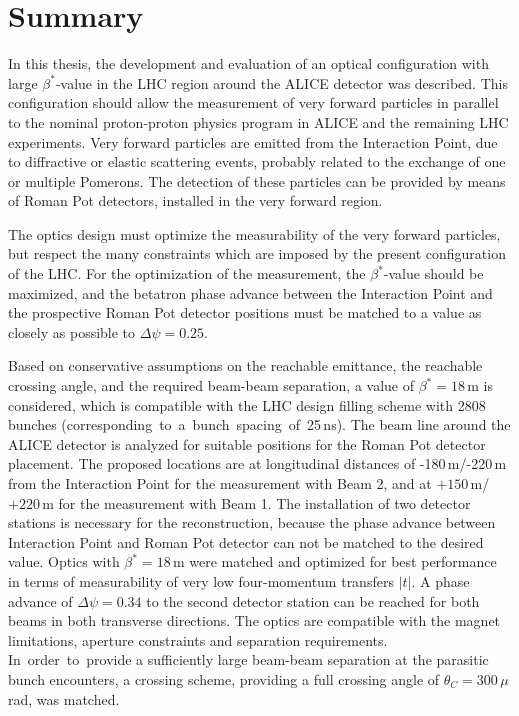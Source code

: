\chapter*{Summary}\label{chap:8}

In this thesis, the development and evaluation of an optical configuration with large $\beta^*$-value in the LHC region around the ALICE detector was described. This configuration should allow the measurement of very forward particles in parallel to the nominal proton-proton physics program in ALICE and the remaining LHC experiments. Very forward particles are emitted from the Interaction Point, due to diffractive or elastic scattering events, probably related to the exchange of one or multiple Pomerons. The detection of these particles can be provided by means of Roman Pot detectors, installed in the very forward region.

The optics design must optimize the measurability of the very forward particles, but respect the many constraints which are imposed by the present configuration of the LHC. For the optimization of the measurement, the $\beta^*$-value should be maximized, and the betatron phase advance between the Interaction Point and the prospective Roman Pot detector positions must be matched to a value as closely as possible to $\Delta \psi =0.25$.

Based on conservative assumptions on the reachable emittance, the reachable crossing angle, and the required beam-beam separation, a value of $\beta^*=18\,$m is considered, which is compatible with the LHC design filling scheme with 2808 bunches \mbox{(corresponding to a bunch spacing of 25$\,$ns)}. The beam line around the ALICE detector is analyzed for suitable positions for the Roman Pot detector placement. The proposed locations are at longitudinal distances of -180$\,$m/-220$\,$m from the Interaction Point for the measurement with Beam 2, and at $+150\,$m/$+220\,$m for the measurement with Beam 1. The installation of two detector stations is necessary for the reconstruction, because the phase advance between Interaction Point and Roman Pot detector can not be matched to the desired value.
Optics with $\beta^*=18\,$m were matched and optimized for best performance in terms of measurability of very low four-momentum transfers $|t|$. A phase advance of $\Delta \psi = 0.34$ to the second detector station can be reached for both beams in both transverse directions. The optics are compatible with the \mbox{magnet} limitations, aperture constraints and separation requirements. \mbox{In order to provide} a sufficiently large beam-beam separation at the parasitic bunch encounters, a crossing scheme, providing a full crossing angle of $\theta_C = 300\,\mu$rad, was matched. 

